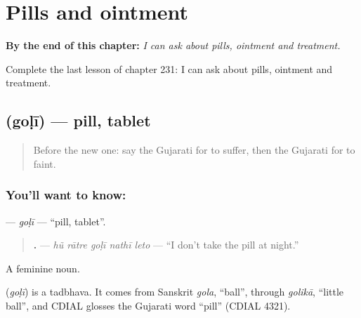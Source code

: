 
\chapter{Pills and ointment}
\label{ch:gu-pills-and-ointment}

\begin{chapteropening}
\textbf{By the end of this chapter:} \emph{I can ask about pills, ointment and treatment.}

Complete the last lesson of chapter 231: I can ask about pills, ointment and treatment.
\end{chapteropening}

\section[\texorpdfstring{\gu{ગોળી} (goḷī)}{ગોળી (goḷī)}]{ (goḷī) — pill, tablet}

\label{lesson:GU-C231-goli}



\begin{quote}
Before the new one: say the Gujarati for to suffer, then the Gujarati for to faint.
\end{quote}

\subsection*{You'll want to know: }
\textbf{} — \emph{goḷī} — \textquotedblleft{}pill, tablet\textquotedblright{}.

\begin{quote}
\textbf{    .} — \emph{hũ rātre goḷī nathī leto} — \textquotedblleft{}I don't take the pill at night.\textquotedblright{}
\end{quote}

A feminine noun.

\begin{cousinweb}
\textbf{} (\emph{goḷī}) is a tadbhava. It comes from Sanskrit \emph{gola}, \textquotedblleft{}ball\textquotedblright{}, through \emph{golikā}, \textquotedblleft{}little ball\textquotedblright{}, and CDIAL glosses the Gujarati word \textquotedblleft{}pill\textquotedblright{} (CDIAL 4321).
\end{cousinweb}

